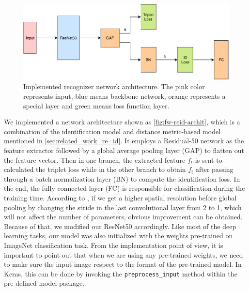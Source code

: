 \begin{figure}
    \includegraphics[width=\linewidth]{figures/framework_reid_archit.pdf}
    \caption[Implemented recognizer network architecture]
    {
        Implemented recognizer network architecture.
        The pink color represents input, blue means backbone network, orange
        represents a special layer and green means loss function layer.
    }
    \label{fig:fw-reid-archit}
\end{figure}

We implemented a network architecture shown as \autoref{fig:fw-reid-archit},
which is a combination of the identification model and distance metric-based
model mentioned in \autoref{sec:related_work_re_id}. It employs a Residual-50
network as the feature extractor followed by a global average pooling layer
(GAP) to flatten out the feature vector. Then in one branch, the extracted
feature $f_t$ is sent to calculated the triplet loss while in
the other branch to obtain $f_i$ after passing through a batch normalization
layer (BN) to compute the identification loss. In the end, the fully connected
layer (FC) is responsible for classification during the training time.
According to \cite{pcb-and-rpp-for-reid},
if we get a higher spatial resolution before global pooling by changing the
stride in the last convolutional layer from 2 to 1, which will not affect the
number of parameters, obvious improvement can be obtained. Because of that, we
modified our ResNet50 accordingly. Like most of the deep learning tasks, our
model was also initialized with the weights pre-trained on ImageNet
classification task. From the implementation point of view, it is important
to point out that when we are using any pre-trained weights, we need to make
sure the input image respect to the format of the pre-trained model. In Keras,
this can be done by invoking the \texttt{preprocess\_input} method within the
pre-defined model package.

